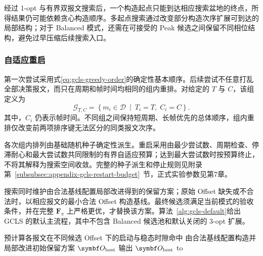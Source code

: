 \documentclass[UTF8,a4paper,twoside,zihao=-4]{ctexart}
\numberwithin{equation}{section}
\numberwithin{figure}{section}
\numberwithin{table}{section}
\theoremstyle{definition}
\numberwithin{algocf}{section}
\renewcommand{\thealgocf}{\thesection-\arabic{algocf}}
\newcommand{\PaperAlgorithmStyle}{\small}
\newcommand{\PaperAlgorithmCaption}[1]{%
  \DontPrintSemicolon
  \mbox{}\;
  \noindent\hbox to\hsize{\hfil{\songti\zihao{5}算法~\thealgocf：#1}\hfil}\;
  \PrintSemicolon
}
\begin{document}
经过 1-opt 与有界双报文搜索后，一个构造起点只能到达相应搜索盆地的终点，所得结果仍可能依赖贪心构造顺序。多起点搜索通过改变部分构造次序扩展可到达的局部结构；对于 Balanced 模式，还需在可接受的 Peak 候选之间保留不同相位结构，避免过早压缩后续搜索入口。

\subsubsection{自适应重启}
\label{subsubsec:gcls-restart}

第一次尝试采用式\eqref{eq:gcls-greedy-order}的确定性基本顺序。后续尝试不任意打乱全部决策报文，而只在周期和帧时间均相同的组内重排。对给定的 $T$ 与 $C$，该组定义为
\begin{equation}
 \mathcal G_{T,C}
 =
 \left\{
  m_i\in\mathcal D
  \ \middle|\
  T_i=T,\;
  C_i=C
 \right\}.
\label{eq:gcls-restart-group}
\end{equation}
其中，$C_i$ 仍表示帧时间。不同组之间保持短周期、长帧优先的总体顺序，组内重排仅改变前两项排序键无法区分的同类报文次序。

各次组内排列由基础随机种子确定性派生。重启采用由最少尝试数、周期检查、停滞耐心和最大尝试数共同限制的有界自适应预算；达到最大尝试数时按预算终止，不将其解释为搜索空间收敛。完整的种子派生和停止规则见附录第~\ref{subsubsec:appendix-gcls-restart-budget}~节，正式实验参数见第7章。

搜索同时维护由合法基线配置局部改进得到的保留方案；原始 Offset 缺失或不合法时，以相应报文的最小合法 Offset 构造基线。最终候选须满足当前模式的验收条件，并在完整 $\symbf F_{\pi}$ 上严格更优，才替换该方案。算法~\ref{alg:gcls-default}给出 GCLS 的默认主流程，其中不包含 Balanced 候选池和默认关闭的 3-opt 扩展。

\begin{algorithm}[htbp]
\PaperAlgorithmStyle
{}
\label{alg:gcls-default}
预计算各报文在不同候选 Offset 下的启动与稳态时隙命中\;
由合法基线配置构造并局部改进初始保留方案 $\symbf O_{\rm best}$\;
输出 $\symbf O_{\rm best}$\;
\PaperAlgorithmCaption{GCLS 默认主流程}
\end{algorithm}
\end{document}
